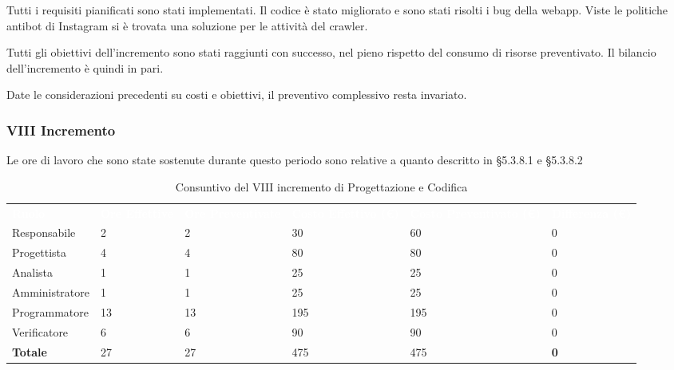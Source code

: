 Tutti i requisiti pianificati sono stati implementati. Il codice è stato migliorato e sono stati risolti i bug della webapp. Viste le politiche antibot di Instagram si è trovata una soluzione per le attività del crawler.

Tutti gli obiettivi dell’incremento sono stati raggiunti con successo, nel pieno rispetto del consumo di risorse preventivato. Il bilancio dell’incremento è quindi in pari.

Date le considerazioni precedenti su costi e obiettivi, il preventivo complessivo resta invariato.


\pagebreak


\subsubsection{VIII Incremento}
Le ore di lavoro che sono state sostenute durante questo periodo sono relative a quanto descritto in §5.3.8.1 e §5.3.8.2

\begin{table}[H]
\begin{center}
\renewcommand{\arraystretch}{1.5}
\begin{tabular}{ m{}<{\centering}  m{}<{\centering} m{}<{\centering} m{}<{\centering} m{}<{\centering} m{}<{\centering}}
	\rowcolor{darkblue}
	\textcolor{white}{\textbf{Ruolo}} & \textcolor{white}{\textbf{Ore Effettive}} & \textcolor{white}{\textbf{Ore Preventivate}}&\textcolor{white}{\textbf{Costo Effettivo (\euro)}}&\textcolor{white}{\textbf{Costo Preventivato (\euro)}}&\textcolor{white}{\textbf{Differenza (\euro)}}\\ 

	Responsabile  & 2 & 2 & 30 & 60 & 0\\	
	
	Progettista & 4 & 4 & 80 & 80 & 0\\
	
	Analista & 1 & 1 & 25 & 25 & 0\\
	
	Amministratore & 1 & 1 & 25 & 25 & 0\\
	
	Programmatore & 13 & 13 & 195 & 195 & 0\\
	
	Verificatore & 6 & 6 & 90 & 90 & 0\\
	
	\textbf{Totale} & 27 & 27 & 475 & 475 & \textbf{0} \\
	
\end{tabular}
\caption{Consuntivo del VIII incremento di Progettazione e Codifica}
\end{center}
\end{table}

